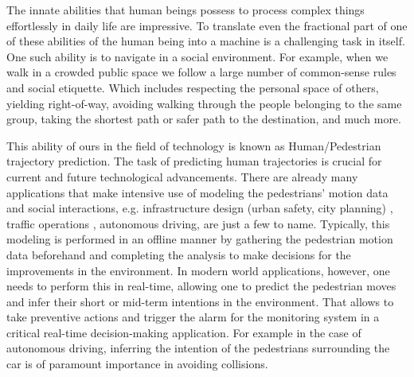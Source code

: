 The innate abilities that human beings possess to process complex things effortlessly in daily life are impressive. To translate even the fractional part of one of these abilities of the human being into a machine is a challenging task in itself. One such ability is to navigate in a social environment. For example, when we walk in a crowded public space we follow a large number of common-sense rules and social etiquette. Which includes respecting the personal space of others, yielding right-of-way, avoiding walking through the people belonging to the same group, taking the shortest path or safer path to the destination, and much more.

This ability of ours in the field of technology is known as Human/Pedestrian trajectory prediction. The task of predicting human trajectories is crucial for current and future technological advancements. There are already many applications that make intensive use of modeling the pedestrians' motion data and social interactions, e.g. infrastructure design (urban safety, city planning) \cite{Hanisch2003OnlineSO, Lerner2007CrowdsBE, Bitgood2006AnAO}, traffic operations \cite{Horni2016TheMT}, autonomous driving, are just a few to name. Typically, this modeling is performed in an offline manner by gathering the pedestrian motion data beforehand and completing the analysis to make decisions for the improvements in the environment. In modern world applications, however, one needs to perform this in real-time, allowing one to predict the pedestrian moves and infer their short or mid-term intentions in the environment. That allows to take preventive actions and trigger the alarm for the monitoring system in a critical real-time decision-making application. For example in the case of autonomous driving, inferring the intention of the pedestrians surrounding the car is of paramount importance in avoiding collisions.

